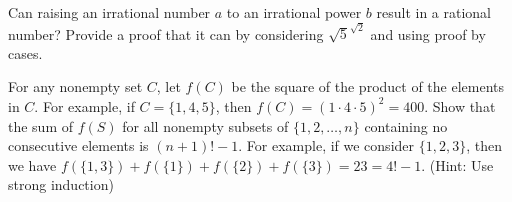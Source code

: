 \documentclass[twoside,12pt]{article}
\begin{document}


\begin{problem}{10}
Can raising an irrational number $a$ to an irrational power $b$ result in a
rational number? Provide a proof that it can by considering $\sqrt{5}^{\sqrt{2}}$
and using proof by cases.
\end{problem}

\begin{problem}{15}
For any nonempty set $C$, let $f(C)$ be the square of the product of the elements in $C$.  For example, if $C = \{ 1, 4, 5 \}$, then $f(C) = (1 \cdot 4 \cdot 5)^2 = 400$.  Show that the sum of $f(S)$ for all nonempty subsets of $\{1, 2, \ldots, n\}$ containing no consecutive elements is $ (n+1)! - 1$.  For example, if we consider $\{1, 2, 3\}$, then we have $f(\{1, 3\}) + f(\{1\}) + f(\{2\}) + f(\{3\}) = 23 = 4! - 1$.  (Hint: Use strong induction)
\end{problem}
\end{document}
